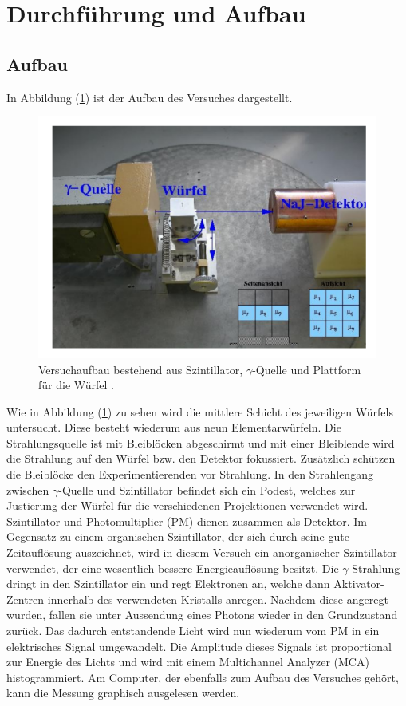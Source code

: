 \newpage
\section{Durchführung und Aufbau}
\label{sec:Durchführung}
\subsection{Aufbau}
In Abbildung (\ref{fig:aufbau}) ist der Aufbau des Versuches dargestellt.
\begin{figure}
	\centering
	\includegraphics[scale=0.5]{fig/aufbau.png}
	\caption{Versuchaufbau bestehend aus Szintillator, $\gamma$-Quelle und Plattform für die Würfel \cite[2]{Anleitung}.}
	\label{fig:aufbau}
\end{figure}
\FloatBarrier
\noindent Wie in Abbildung (\ref{fig:aufbau}) zu sehen wird die mittlere Schicht des jeweiligen Würfels untersucht. Diese besteht wiederum aus neun Elementarwürfeln. Die Strahlungsquelle
ist mit Bleiblöcken abgeschirmt und mit einer Bleiblende wird die Strahlung auf den Würfel bzw. den Detektor fokussiert. Zusätzlich schützen die Bleiblöcke den Experimentierenden vor Strahlung. In den Strahlengang zwischen $\gamma$-Quelle und Szintillator befindet sich ein Podest, welches zur Justierung
der Würfel für die verschiedenen Projektionen verwendet wird.\\
Szintillator und Photomultiplier (PM) dienen zusammen als Detektor. Im Gegensatz zu einem organischen Szintillator, der sich durch seine gute Zeitauflösung auszeichnet, wird in diesem Versuch ein anorganischer Szintillator verwendet, der eine wesentlich bessere Energieauflösung
besitzt. Die $\gamma$-Strahlung dringt in den Szintillator ein und regt Elektronen an, welche dann Aktivator-Zentren innerhalb des verwendeten Kristalls anregen. Nachdem diese angeregt
wurden, fallen sie unter Aussendung eines Photons wieder in den Grundzustand zurück. Das dadurch entstandende Licht wird nun wiederum vom PM in ein elektrisches Signal umgewandelt. Die
Amplitude dieses Signals ist proportional zur Energie des Lichts und wird mit einem Multichannel Analyzer (MCA) histogrammiert. Am Computer, der ebenfalls zum Aufbau des Versuches gehört, kann die Messung graphisch ausgelesen werden.
